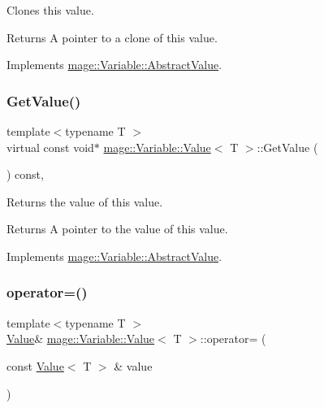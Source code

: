 Clones this value.

\begin{DoxyReturn}{Returns}
A pointer to a clone of this value. 
\end{DoxyReturn}


Implements \hyperlink{structmage_1_1_variable_1_1_abstract_value_aa81140618fdb83ad33f56322a043e23f}{mage\+::\+Variable\+::\+Abstract\+Value}.

\hypertarget{structmage_1_1_variable_1_1_value_a04d70496ebb7ad71dafa3df877daeb26}{}\label{structmage_1_1_variable_1_1_value_a04d70496ebb7ad71dafa3df877daeb26} 
\subsubsection{\texorpdfstring{Get\+Value()}{GetValue()}}
{\footnotesize\ttfamily template$<$typename T $>$ \\
virtual const void$\ast$ \hyperlink{structmage_1_1_variable_1_1_value}{mage\+::\+Variable\+::\+Value}$<$ T $>$\+::Get\+Value (\begin{DoxyParamCaption}{ }\end{DoxyParamCaption}) const\hspace{0.3cm}{\ttfamily [override]}, {\ttfamily [virtual]}}

Returns the value of this value.

\begin{DoxyReturn}{Returns}
A pointer to the value of this value. 
\end{DoxyReturn}


Implements \hyperlink{structmage_1_1_variable_1_1_abstract_value_aede2a77b571b80794a4254e34144f4c1}{mage\+::\+Variable\+::\+Abstract\+Value}.

\hypertarget{structmage_1_1_variable_1_1_value_a19c45282edac9ffaa0f687b7dd414392}{}\label{structmage_1_1_variable_1_1_value_a19c45282edac9ffaa0f687b7dd414392} 
\subsubsection{\texorpdfstring{operator=()}{operator=()}\hspace{0.1cm}{\footnotesize\ttfamily [1/2]}}
{\footnotesize\ttfamily template$<$typename T $>$ \\
\hyperlink{structmage_1_1_variable_1_1_value}{Value}\& \hyperlink{structmage_1_1_variable_1_1_value}{mage\+::\+Variable\+::\+Value}$<$ T $>$\+::operator= (\begin{DoxyParamCaption}\item[{const \hyperlink{structmage_1_1_variable_1_1_value}{Value}$<$ T $>$ \&}]{value }\end{DoxyParamCaption})\hspace{0.3cm}{\ttfamily [delete]}}

